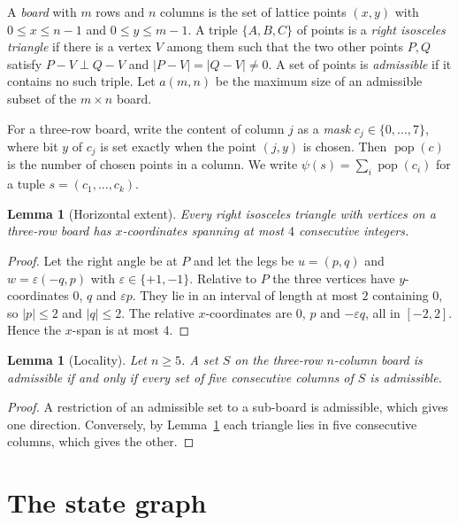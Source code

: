 \documentclass[11pt]{article}
\newtheorem{lemma}[theorem]{Lemma}
\theoremstyle{definition}
\theoremstyle{remark}
\begin{document}
A \emph{board} with $m$ rows and $n$ columns is the set of lattice points $(x,y)$ with $0\le x\le n-1$ and $0\le y\le m-1$. A triple $\{A,B,C\}$ of points is a \emph{right isosceles triangle} if there is a vertex $V$ among them such that the two other points $P,Q$ satisfy $P-V\perp Q-V$ and $|P-V|=|Q-V|\neq 0$. A set of points is \emph{admissible} if it contains no such triple. Let $a(m,n)$ be the maximum size of an admissible subset of the $m\times n$ board.

For a three-row board, write the content of column $j$ as a \emph{mask} $c_j\in\{0,\dots,7\}$, where bit $y$ of $c_j$ is set exactly when the point $(j,y)$ is chosen. Then $\operatorname{pop}(c)$ is the number of chosen points in a column. We write $\psi(s)=\sum_i\operatorname{pop}(c_i)$ for a tuple $s=(c_1,\dots,c_k)$.

\begin{lemma}[Horizontal extent]\label{lem:extent}
Every right isosceles triangle with vertices on a three-row board has $x$-coordinates spanning at most $4$ consecutive integers.
\end{lemma}

\begin{proof}
Let the right angle be at $P$ and let the legs be $u=(p,q)$ and $w=\varepsilon(-q,p)$ with $\varepsilon\in\{+1,-1\}$. Relative to $P$ the three vertices have $y$-coordinates $0$, $q$ and $\varepsilon p$. They lie in an interval of length at most $2$ containing $0$, so $|p|\le 2$ and $|q|\le 2$. The relative $x$-coordinates are $0$, $p$ and $-\varepsilon q$, all in $[-2,2]$. Hence the $x$-span is at most $4$.
\end{proof}

\begin{lemma}[Locality]\label{lem:local}
Let $n\ge 5$. A set $S$ on the three-row $n$-column board is admissible if and only if every set of five consecutive columns of $S$ is admissible.
\end{lemma}

\begin{proof}
A restriction of an admissible set to a sub-board is admissible, which gives one direction. Conversely, by Lemma~\ref{lem:extent} each triangle lies in five consecutive columns, which gives the other.
\end{proof}

\section{The state graph}
\end{document}
